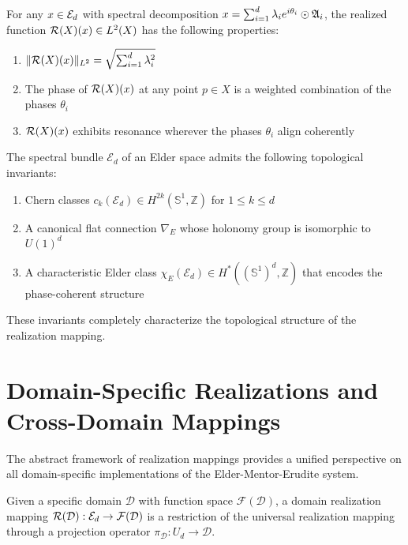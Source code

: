 \begin{lemma}
For any $x \in \mathcal{E}_{d}$ with spectral decomposition $x = \sum_{i=1}^{d} \lambda_i e^{i\theta_i} \odot \mathfrak{A}_{i}$, the realized function $\mathcal{R}(X)(x) \in L^2(X)$ has the following properties:
\begin{enumerate}
    \item $\|\mathcal{R}(X)(x)\|_{L^2} = \sqrt{\sum_{i=1}^{d} \lambda_i^2}$
    \item The phase of $\mathcal{R}(X)(x)$ at any point $p \in X$ is a weighted combination of the phases $\theta_i$
    \item $\mathcal{R}(X)(x)$ exhibits resonance wherever the phases $\theta_i$ align coherently
\end{enumerate}
\end{lemma}

\begin{theorem}
The spectral bundle $\mathcal{E}_d$ of an Elder space admits the following topological invariants:
\begin{enumerate}
    \item Chern classes $c_k(\mathcal{E}_d) \in H^{2k}(\mathbb{S}^1, \mathbb{Z})$ for $1 \leq k \leq d$
    \item A canonical flat connection $\nabla_E$ whose holonomy group is isomorphic to $U(1)^d$
    \item A characteristic Elder class $\chi_E(\mathcal{E}_d) \in H^*((\mathbb{S}^1)^d, \mathbb{Z})$ that encodes the phase-coherent structure
\end{enumerate}
These invariants completely characterize the topological structure of the realization mapping.
\end{theorem}

\section{Domain-Specific Realizations and Cross-Domain Mappings}

The abstract framework of realization mappings provides a unified perspective on all domain-specific implementations of the Elder-Mentor-Erudite system.

\begin{definition}
Given a specific domain $\mathcal{D}$ with function space $\mathcal{F}(\mathcal{D})$, a domain realization mapping $\mathcal{R}(\mathcal{D}): \mathcal{E}_{d} \rightarrow \mathcal{F}(\mathcal{D})$ is a restriction of the universal realization mapping through a projection operator $\pi_{\mathcal{D}}: U_d \rightarrow \mathcal{D}$.
\end{definition}

